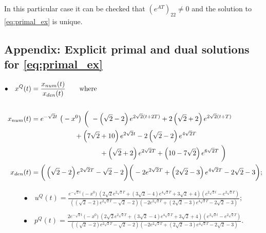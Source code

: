 \documentclass[11pt]{article}
\begin{document}
In this particular case it can be checked that $(e^{AT})_{22} \neq 0$ and the solution to \eqref{eq:primal_ex} is unique.



\begin{appendix} 
\section{Appendix: Explicit primal and dual solutions for \eqref{eq:primal_ex}}

\begin{subequations}
\allowdisplaybreaks
    \begin{align}
     \bullet \quad x^Q(t)  &= \frac{x_{num}(t)}{x_{den}(t)} \qquad \mbox{where}\\
     \notag \\
x_{num}(t) & = e^{-\sqrt{2} t} \  \big( -x^0 \big)  \ \bigg( \ -\left(\sqrt{2}-2\right) e^{2 \sqrt{2} (t+2 T)} +2 \left(\sqrt{2}+2\right) e^{2 \sqrt{2} (t+T)} \notag\\
& \qquad \qquad \qquad \ +\left(7 \sqrt{2}+10\right) e^{2 \sqrt{2} t} -2 \left(\sqrt{2}-2\right) e^{4 \sqrt{2} T} \notag\\
 &  \qquad \qquad \qquad \qquad  \qquad +\left(\sqrt{2}+2\right) e^{2 \sqrt{2} T} +\left(10-7 \sqrt{2}\right) e^{6 \sqrt{2} T} \ \bigg) \notag\\
  x_{den} (t)  & = \bigg(\left(\sqrt{2}-2\right) e^{2 \sqrt{2} T}-\sqrt{2}-2\bigg) \bigg(-2 e^{2 \sqrt{2} T}+\left(2 \sqrt{2}-3\right) e^{4 \sqrt{2} T}-2 \sqrt{2}-3 \bigg); \notag
    \end{align}
\end{subequations}
\begin{equation*}
    \begin{aligned}
    \\
      \bullet \quad   u^Q(t) = \frac{e^{-\sqrt{2} t} \ \big(- x^0 \big) \ \left(2 \sqrt{2} e^{2 \sqrt{2} T}+\left(3 \sqrt{2}-4\right) e^{4 \sqrt{2} T}+3 \sqrt{2}+4\right) \left(e^{2 \sqrt{2} t}-e^{2 \sqrt{2} T}\right)}{\left(\left(\sqrt{2}-2\right) e^{2 \sqrt{2} T}-\sqrt{2}-2\right) \left(-2 e^{2 \sqrt{2} T}+\left(2 \sqrt{2}-3\right) e^{4 \sqrt{2} T}-2 \sqrt{2}-3\right)};
    \end{aligned}
\end{equation*}
\begin{equation*}
    \begin{aligned}
    \\
       \bullet \quad  p^Q(t) = \frac{2 e^{-\sqrt{2} t} \ \big(- x^0 \big) \ \left(2 \sqrt{2} e^{2 \sqrt{2} T}+\left(3 \sqrt{2}-4\right) e^{4 \sqrt{2} T}+3 \sqrt{2}+4\right)  \left(e^{2 \sqrt{2} t}-e^{2 \sqrt{2} T}\right)}{\left(\left(\sqrt{2}-2\right) e^{2 \sqrt{2} T}-\sqrt{2}-2\right) \left(-2 e^{2 \sqrt{2} T}+\left(2 \sqrt{2}-3\right) e^{4 \sqrt{2} T}-2 \sqrt{2}-3\right)}.
    \end{aligned}
\end{equation*}


\end{appendix}
\end{document}
